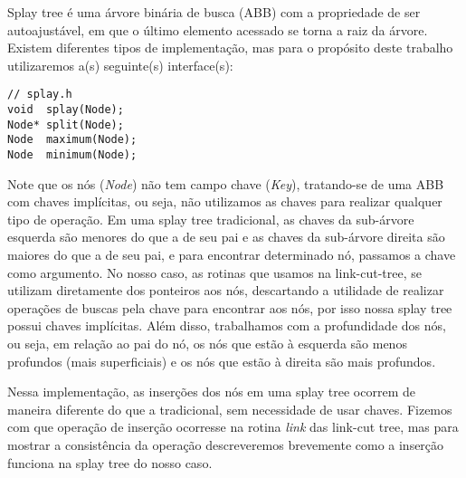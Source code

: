Splay tree é uma árvore binária de busca (ABB) com a propriedade de ser autoajustável, em que o último elemento acessado se torna a raiz da árvore. Existem diferentes tipos de implementação, mas para o propósito deste trabalho utilizaremos a(s) seguinte(s) interface(s):  



\begin{verbatim}
// splay.h
void  splay(Node);
Node* split(Node);
Node  maximum(Node);
Node  minimum(Node);
\end{verbatim}

Note que os nós (\textit{Node}) não tem campo chave (\textit{Key}), tratando-se de uma ABB com chaves implícitas, ou seja, não utilizamos as chaves para realizar qualquer tipo de operação. Em uma splay tree tradicional, as chaves da sub-árvore esquerda são menores do que a de seu pai e as chaves da sub-árvore direita são maiores do que a de seu pai, e para encontrar determinado nó, passamos a chave como argumento. No nosso caso, as rotinas que usamos na link-cut-tree, se utilizam diretamente dos ponteiros aos nós, descartando a utilidade de realizar operações de buscas pela chave para encontrar aos nós, por isso nossa splay tree possui chaves implícitas. Além disso, trabalhamos com a profundidade dos nós, ou seja, em relação ao pai do nó, os nós que estão à esquerda são menos profundos (mais superficiais) e os nós que estão à direita são mais profundos.  



Nessa implementação, as inserções dos nós em uma splay tree ocorrem de maneira diferente do que a tradicional, sem necessidade de usar chaves. Fizemos com que operação de inserção ocorresse na rotina \textit{link} das link-cut tree, mas para mostrar a consistência da operação descreveremos brevemente como a inserção funciona na splay tree do nosso caso.  


